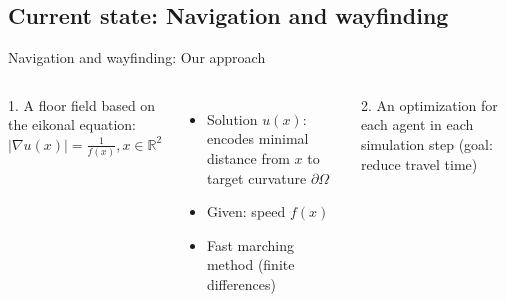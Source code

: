 \documentclass[compress,t,usenames,xcolor=dvipsnames]{beamer}
\begin{document}
\subsection{Current state: Navigation and wayfinding}

\begin{frame}{Navigation and wayfinding: Our approach}
    \begin{columns}[T]
        \begin{minipage}[c][0.4\textheight][t]{\textwidth}
            \alert<1-2>{1. A floor field based on the eikonal equation:}\\[2mm]
            \(| \nabla u(x)| = \frac 1 {f(x)}, x \in \mathbb{R}^2 \)
            \begin{itemize}
                \item Solution \(u(x)\): encodes minimal distance from \(x\) to target curvature \(\partial \Omega\)
                \item Given: speed \(f(x)\)
                \item Fast marching method (finite differences)
            \end{itemize}
            \vspace{-1mm}
            \centering
        \end{minipage}
        \begin{minipage}[c][0.4\textheight][t]{\textwidth}
            \alert<3->{2. An optimization for each agent in each simulation step (goal: reduce travel time)}
        \end{minipage}
    \end{columns}
\end{frame}
\end{document}
